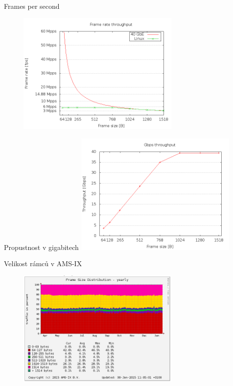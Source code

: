 \documentclass{beamer}
\begin{document}
\begin{frame}{Frames per second}
	\begin{figure}
		\centering
		\includegraphics[width=8cm,keepaspectratio]{fig/frames.png}
	\end{figure}
\end{frame}

\begin{frame}{Propustnost v gigabitech}
	\centering
	\includegraphics[width=8cm,keepaspectratio]{fig/gigabits.png}
\end{frame}

\begin{frame}{Velikost rámců v AMS-IX}
	\begin{figure}
		\centering
		\includegraphics[width=8cm,keepaspectratio]{fig/amsix.png}
	\end{figure}
\end{frame}
\end{document}
